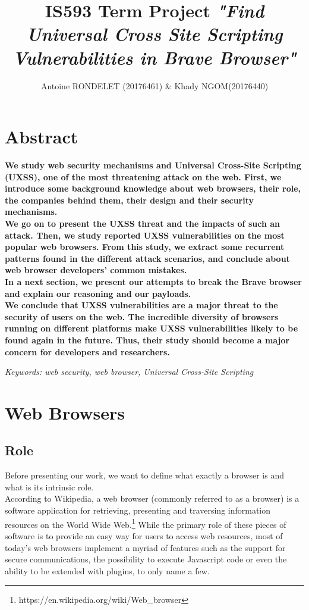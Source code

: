 \documentclass[journal]{IEEEtran}
\begin{document}
\title{IS593 Term Project \emph{"Find Universal Cross Site Scripting Vulnerabilities in Brave Browser"}}

\author{Antoine RONDELET (20176461) \& Khady NGOM(20176440)}
\maketitle
\IEEEpeerreviewmaketitle

\section*{Abstract}

\textbf{We study web security mechanisms and Universal Cross-Site Scripting (UXSS), one of the most threatening attack on the web. First, we introduce some background knowledge about web browsers, their role, the companies behind them, their design and their security mechanisms. \\
We go on to present the UXSS threat and the impacts of such an attack. Then, we study reported UXSS vulnerabilities on the most popular web browsers. From this study, we extract some recurrent patterns found in the different attack scenarios, and conclude about web browser developers' common mistakes.\\
In a next section, we present our attempts to break the Brave browser and explain our reasoning and our payloads. \\
We conclude that UXSS vulnerabilities are a major threat to the security of users on the web. The incredible diversity of browsers running on different platforms make UXSS vulnerabilities likely to be found again in the future. Thus, their study should become a major concern for developers and researchers.}

\bigskip

\emph{Keywords: web security, web browser, Universal Cross-Site Scripting}

\section{Web Browsers}

\subsection{Role}
Before presenting our work, we want to define what exactly a browser is and what is its intrinsic role. \\
According to Wikipedia, a web browser (commonly referred to as a browser) is a software application for retrieving, presenting and traversing information resources on the World Wide Web.\footnote{https://en.wikipedia.org/wiki/Web\_browser} 
While the primary role of these pieces of software is to provide an easy way for users to access web resources, most of today's web browsers implement a myriad of features such as the support for secure communications, the possibility to execute Javascript code or even the ability to be extended with plugins, to only name a few.
\end{document}

